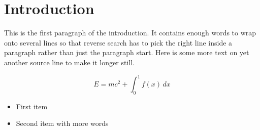 \documentclass{article}
\begin{document}
\section{Introduction}
This is the first paragraph of the introduction. It contains enough words
to wrap onto several lines so that reverse search has to pick the right
line inside a paragraph rather than just the paragraph start.
Here is some more text on yet another source line to make it longer still.



\begin{equation}
  E = mc^2 + \int_0^1 f(x)\,dx
\end{equation}

\begin{itemize}
  \item First item
  \item Second item with more words
\end{itemize}
\end{document}
